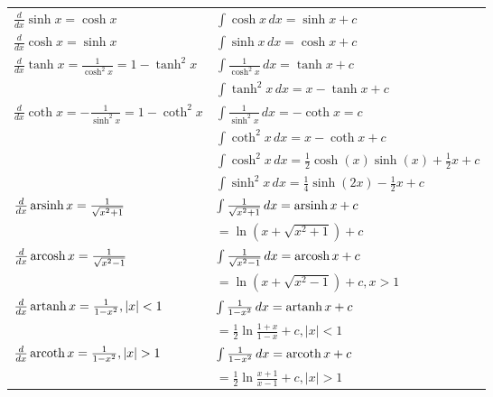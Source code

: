 \begin{longtable}{ll}
        \midrule
        $\frac{d}{dx} \sinh{x} = \cosh{x}$ &
        $\int \cosh{x}\,dx = \sinh{x} + c$
        \\
        $\frac{d}{dx} \cosh{x} = \sinh{x}$ &
        $\int \sinh{x}\,dx = \cosh{x} + c$
        \\
        \multirow{2}{*}{$\frac{d}{dx} \tanh{x} = \frac{1}{\cosh^2{x}} = 1 - \tanh^2{x}$} &
        $\int \frac{1}{\cosh^2{x}}\,dx = \tanh{x} + c$ \\* &
        $\int \tanh^2{x}\,dx = x - \tanh{x} + c$
        \\
        \multirow{2}{*}{$\frac{d}{dx} \coth{x} = -\frac{1}{\sinh^2{x}} = 1 - \coth^2{x}$} &
        $\int \frac{1}{\sinh^2{x}}\,dx = -\coth{x} = c$ \\* &
        $\int \coth^2{x}\,dx = x - \coth{x} + c$
        \\
        \midrule
        &
        $\int \cosh^2{x}\,dx = \frac{1}{2}\cosh{(x)}\sinh{(x)}+\frac{1}{2}x + c$
        \\
        &
        $\int \sinh^2{x}\,dx = \frac{1}{4}\sinh{(2x)}-\frac{1}{2}x + c$
        \\

        \midrule
        \multirow{2}{*}{$\frac{d}{dx} \operatorname{arsinh}{x} = \frac{1}{\sqrt{x^2+1}}$} &
        $\int \frac{1}{\sqrt{x^2+1}}\,dx = \operatorname{arsinh}{x} + c$ \\* &
        $=\ln{\left(x + \sqrt{x^2+1}\right)} + c$
        \\
        \multirow{2}{*}{$\frac{d}{dx} \operatorname{arcosh}{x} = \frac{1}{\sqrt{x^2-1}}$} &
        $\int \frac{1}{\sqrt{x^2-1}}\,dx = \operatorname{arcosh}{x} + c$ \\* &
        $=\ln{\left(x + \sqrt{x^2-1}\right)} + c, x > 1$
        \\
        \multirow{2}{*}{$\frac{d}{dx} \operatorname{artanh}{x} = \frac{1}{1-x^2}, |x| < 1$} &
        $\int \frac{1}{1-x^2}\,dx = \operatorname{artanh}{x} + c$ \\* &
        $=\frac{1}{2}\ln{\frac{1+x}{1-x}} + c, |x| < 1$
        \\
        \multirow{2}{*}{$\frac{d}{dx} \operatorname{arcoth}{x} = \frac{1}{1-x^2}, |x| > 1$} &
        $\int \frac{1}{1-x^2}\,dx = \operatorname{arcoth}{x} + c$ \\* &
        $=\frac{1}{2}\ln{\frac{x+1}{x-1}} + c, |x| > 1$
        \\


        \bottomrule
    \end{longtable}

